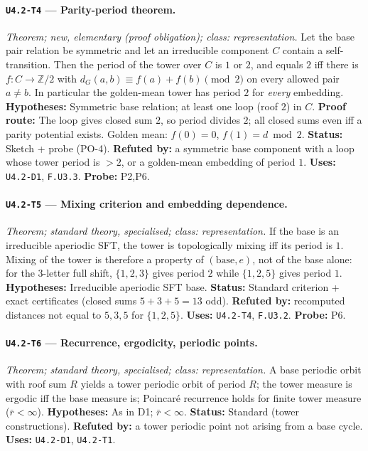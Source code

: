 \documentclass[11pt]{article}
\begin{document}
\paragraph{\texttt{U4.2-T4} --- Parity-period theorem.} \emph{Theorem; new, elementary (proof obligation); class: representation.} Let the base pair relation be symmetric and let an irreducible component $C$ contain a self-transition. Then the period of the tower over $C$ is $1$ or $2$, and equals $2$ iff there is $f:C\to\mathbb Z/2$ with $d_G(a,b)\equiv f(a)+f(b)\pmod 2$ on every allowed pair $a\ne b$. In particular the golden-mean tower has period $2$ for \emph{every} embedding. \textbf{Hypotheses:} Symmetric base relation; at least one loop (roof $2$) in $C$. \textbf{Proof route:} The loop gives closed sum $2$, so period divides $2$; all closed sums even iff a parity potential exists. Golden mean: $f(0)=0$, $f(1)=d\bmod2$. \textbf{Status:} Sketch + probe (PO-4). \textbf{Refuted by:} a symmetric base component with a loop whose tower period is $>2$, or a golden-mean embedding of period $1$. \textbf{Uses:} \texttt{U4.2-D1}, \texttt{F.U3.3}. \textbf{Probe:} P2,P6.

\paragraph{\texttt{U4.2-T5} --- Mixing criterion and embedding dependence.} \emph{Theorem; standard theory, specialised; class: representation.} If the base is an irreducible aperiodic SFT, the tower is topologically mixing iff its period is $1$. Mixing of the tower is therefore a property of $(\text{base},e)$, not of the base alone: for the 3-letter full shift, $\{1,2,3\}$ gives period $2$ while $\{1,2,5\}$ gives period $1$. \textbf{Hypotheses:} Irreducible aperiodic SFT base. \textbf{Status:} Standard criterion + exact certificates (closed sums $5+3+5=13$ odd). \textbf{Refuted by:} recomputed distances not equal to $5,3,5$ for $\{1,2,5\}$. \textbf{Uses:} \texttt{U4.2-T4}, \texttt{F.U3.2}. \textbf{Probe:} P6.

\paragraph{\texttt{U4.2-T6} --- Recurrence, ergodicity, periodic points.} \emph{Theorem; standard theory, specialised; class: representation.} A base periodic orbit with roof sum $R$ yields a tower periodic orbit of period $R$; the tower measure is ergodic iff the base measure is; Poincar\'e recurrence holds for finite tower measure ($\bar r<\infty$). \textbf{Hypotheses:} As in D1; $\bar r<\infty$. \textbf{Status:} Standard (tower constructions). \textbf{Refuted by:} a tower periodic point not arising from a base cycle. \textbf{Uses:} \texttt{U4.2-D1}, \texttt{U4.2-T1}.
\end{document}

